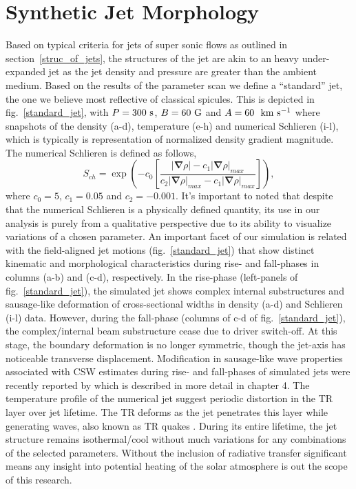 \documentclass[12pt]{ociamthesis}
\newcommand{\kms}{~\rm{km ~s^{-1}}}
\newcommand{\np}{\\ \\}
\begin{document}
\section{Synthetic Jet Morphology}
Based on typical criteria for jets of super sonic flows as outlined in section~\ref{struc_of_jets}, the structures of the jet are akin to an heavy under-expanded jet \citep{Norman1982, Edgington-Mitchell2014} as the jet density and pressure are greater than the ambient medium. Based on the results of the parameter scan we define a ``standard'' jet, the one we believe most reflective of classical spicules. This is depicted in fig.~\ref{standard_jet}, with $P=300~\rm{s}$, $B=60~\rm{G}$ and $A=60~\kms$ where snapshots of the density (a-d), temperature (e-h) and numerical Schlieren (i-l), which is typically is representation of normalized density gradient magnitude. The numerical Schlieren is defined as follows,
\begin{equation}
    S_{ch} = \exp{\left( -c_0 \left[ \frac{|\boldsymbol{\nabla} \rho|-c_1 |\boldsymbol{\nabla} \rho|_{max}}{c_2 |\boldsymbol{\nabla} \rho|_{max}-c_1|\boldsymbol{\nabla} \rho|_{max}} \right] \right)}, 
\end{equation}
where $c_0=5$, $c_1=0.05$ and $c_2=-0.001$. It's important to noted that despite that the numerical Schlieren is a physically defined quantity, its use in our analysis is purely from a qualitative perspective due to its ability to visualize variations of a chosen parameter. An important facet of our simulation is related with the field-aligned jet motions (fig.~\ref{standard_jet}) that show distinct kinematic and morphological characteristics during rise- and fall-phases in columns (a-b) and (c-d), respectively. In the rise-phase (left-panels of fig.~\ref{standard_jet}), the simulated jet shows complex internal substructures and sausage-like deformation of cross-sectional widths in density (a-d) and Schlieren (i-l) data. However, during the fall-phase (columns of c-d of fig.~\ref{standard_jet}), the complex/internal beam substructure cease due to driver switch-off. At this stage, the boundary deformation is no longer symmetric, though the jet-axis has noticeable transverse displacement. Modification in sausage-like wave properties associated with CSW estimates during rise- and fall-phases of simulated jets were recently reported by \citep{Mackenzie_Dover_2020} which is described in more detail in chapter 4. The temperature profile of the numerical jet suggest periodic distortion in the TR layer over jet lifetime. The TR deforms as the jet penetrates this layer while generating waves, also known as TR quakes \citep{Scullion2011ApJ74314S}. During its entire lifetime, the jet structure remains isothermal/cool without much variations for any combinations of the selected parameters. Without the inclusion of radiative transfer significant means any insight into potential heating of the solar atmosphere is out the scope of this research. \np
\end{document}
